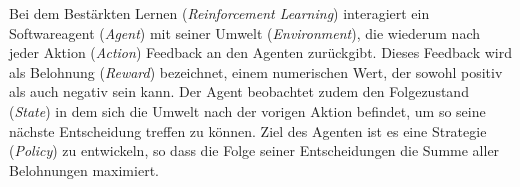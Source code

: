 Bei dem Bestärkten Lernen (\textit{Reinforcement Learning}) interagiert ein Softwareagent (\textit{Agent}) mit seiner Umwelt (\textit{Environment}), die wiederum nach jeder Aktion (\textit{Action}) Feedback an den Agenten zurückgibt. Dieses Feedback wird als Belohnung (\textit{Reward}) bezeichnet, einem numerischen Wert, der sowohl positiv als auch negativ sein kann. Der Agent beobachtet zudem den Folgezustand (\textit{State}) in dem sich die Umwelt nach der vorigen Aktion befindet, um so seine nächste Entscheidung treffen zu können. Ziel des Agenten ist es eine Strategie (\textit{Policy}) zu entwickeln, so dass die Folge seiner Entscheidungen die Summe aller Belohnungen maximiert.